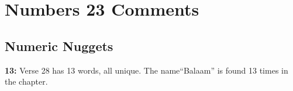 \section{Numbers 23 Comments}

\subsection{Numeric Nuggets}
\textbf{13: } Verse 28 has 13 words, all unique. The name``Balaam'' is found 13 times in the chapter.

